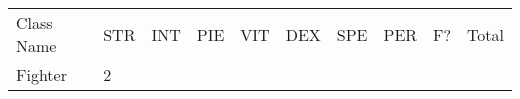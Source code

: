 \documentclass[12pt]{article}
\newcommand{\indexClass}[1]{\index{#1}}
\newcommand{\class}[1]{#1\indexClass{#1}}
\begin{document}
\begin{longtable}[]{@{}llllllllll@{}}
\toprule
\begin{minipage}[t]{0.13\columnwidth}\raggedright\strut
Class Name
\strut\end{minipage} &
\begin{minipage}[t]{0.06\columnwidth}\raggedright\strut
STR
\strut\end{minipage} &
\begin{minipage}[t]{0.06\columnwidth}\raggedright\strut
INT
\strut\end{minipage} &
\begin{minipage}[t]{0.06\columnwidth}\raggedright\strut
PIE
\strut\end{minipage} &
\begin{minipage}[t]{0.06\columnwidth}\raggedright\strut
VIT
\strut\end{minipage} &
\begin{minipage}[t]{0.06\columnwidth}\raggedright\strut
DEX
\strut\end{minipage} &
\begin{minipage}[t]{0.06\columnwidth}\raggedright\strut
SPE
\strut\end{minipage} &
\begin{minipage}[t]{0.06\columnwidth}\raggedright\strut
PER
\strut\end{minipage} &
\begin{minipage}[t]{0.07\columnwidth}\raggedright\strut
F?
\strut\end{minipage} &
\begin{minipage}[t]{0.08\columnwidth}\raggedright\strut
Total
\strut\end{minipage}\tabularnewline
\begin{minipage}[t]{0.13\columnwidth}\raggedright\strut
\class{Fighter}
\strut\end{minipage} &
\begin{minipage}[t]{0.06\columnwidth}\raggedright\strut
2
\strut\end{minipage} &
\begin{minipage}[t]{0.06\columnwidth}\raggedright\strut
\strut\end{minipage} &
\begin{minipage}[t]{0.06\columnwidth}\raggedright\strut
\strut\end{minipage} &
\begin{minipage}[t]{0.06\columnwidth}\raggedright\strut
\strut\end{minipage} &
\begin{minipage}[t]{0.06\columnwidth}\raggedright\strut

\end{minipage}
\end{longtable}
\end{document}
